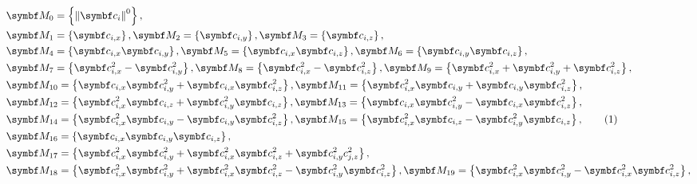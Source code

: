 \begin{align*}
    & \boldsymbol{M}_0=\left\{\left\|\boldsymbol{c}_i\right\|^0\right\}, \\
    & \boldsymbol{M}_1=\left\{\boldsymbol{c}_{i, x}\right\}, \boldsymbol{M}_2=\left\{\boldsymbol{c}_{i, y}\right\}, \boldsymbol{M}_3=\left\{\boldsymbol{c}_{i, z}\right\}, \\
    & \boldsymbol{M}_4=\left\{\boldsymbol{c}_{i, x} \boldsymbol{c}_{i, y}\right\}, \boldsymbol{M}_5=\left\{\boldsymbol{c}_{i, x} \boldsymbol{c}_{i, z}\right\}, \boldsymbol{M}_6=\left\{\boldsymbol{c}_{i, y} \boldsymbol{c}_{i, z}\right\}, \\
    & \boldsymbol{M}_7=\left\{\boldsymbol{c}_{i, x}^2-\boldsymbol{c}_{i, y}^2\right\}, \boldsymbol{M}_8=\left\{\boldsymbol{c}_{i, x}^2-\boldsymbol{c}_{i, z}^2\right\}, \boldsymbol{M}_9=\left\{\boldsymbol{c}_{i, x}^2+\boldsymbol{c}_{i, y}^2+\boldsymbol{c}_{i, z}^2\right\}, \\
    & \boldsymbol{M}_{10}=\left\{\boldsymbol{c}_{i, x} \boldsymbol{c}_{i, y}^2+\boldsymbol{c}_{i, x} \boldsymbol{c}_{i, z}^2\right\}, \boldsymbol{M}_{11}=\left\{\boldsymbol{c}_{i, x}^2 \boldsymbol{c}_{i, y}+\boldsymbol{c}_{i, y} \boldsymbol{c}_{i, z}^2\right\}, \\
    & \boldsymbol{M}_{12}=\left\{\boldsymbol{c}_{i, x}^2 \boldsymbol{c}_{i, z}+\boldsymbol{c}_{i, y}^2 \boldsymbol{c}_{i, z}\right\}, \boldsymbol{M}_{13}=\left\{\boldsymbol{c}_{i, x} \boldsymbol{c}_{i, y}^2-\boldsymbol{c}_{i, x} \boldsymbol{c}_{i, z}^2\right\}, \\
    & \boldsymbol{M}_{14}=\left\{\boldsymbol{c}_{i, x}^2 \boldsymbol{c}_{i, y}-\boldsymbol{c}_{i, y} \boldsymbol{c}_{i, z}^2\right\}, \boldsymbol{M}_{15}=\left\{\boldsymbol{c}_{i, x}^2 \boldsymbol{c}_{i, z}-\boldsymbol{c}_{i, y}^2 \boldsymbol{c}_{i, z}\right\}, \stepcounter{equation}\tag{\theequation} 
    \label{eq:rm_mrt} \\
    & \boldsymbol{M}_{16}=\left\{\boldsymbol{c}_{i, x} \boldsymbol{c}_{i, y} \boldsymbol{c}_{i, z}\right\}, \\
    & \boldsymbol{M}_{17}=\left\{\boldsymbol{c}_{i, x}^2 \boldsymbol{c}_{i, y}^2+\boldsymbol{c}_{i, x}^2 \boldsymbol{c}_{i, z}^2+\boldsymbol{c}_{i, y}^2 c_{j, z}^2\right\}, \\
    & \boldsymbol{M}_{18}=\left\{\boldsymbol{c}_{i, x}^2 \boldsymbol{c}_{i, y}^2+\boldsymbol{c}_{i, x}^2 \boldsymbol{c}_{i, z}^2-\boldsymbol{c}_{i, y}^2 \boldsymbol{c}_{i, z}^2\right\}, \boldsymbol{M}_{19}=\left\{\boldsymbol{c}_{i, x}^2 \boldsymbol{c}_{i, y}^2-\boldsymbol{c}_{i, x}^2 \boldsymbol{c}_{i, z}^2\right\}, \\

\end{align*}
